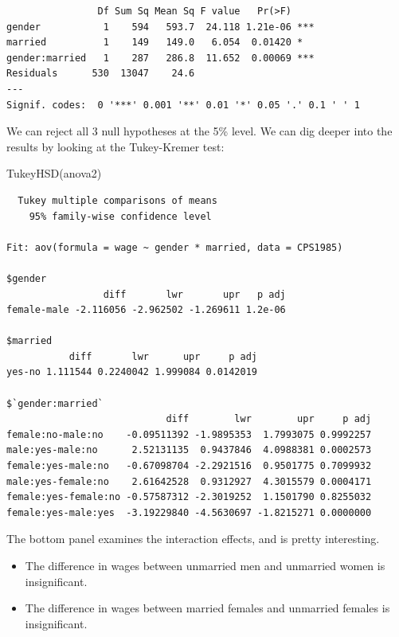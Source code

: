 \documentclass[
  letterpaper,
]{book}
\newenvironment{Shaded}{\begin{snugshade}}{\end{snugshade}}
\newcommand{\FunctionTok}[1]{\textcolor[rgb]{0.28,0.35,0.67}{#1}}
\newcommand{\NormalTok}[1]{\textcolor[rgb]{0.00,0.23,0.31}{#1}}
\providecommand{\tightlist}{%
  \setlength{\itemsep}{0pt}\setlength{\parskip}{0pt}}\usepackage{longtable,booktabs,array}
\begin{document}
\begin{verbatim}
                Df Sum Sq Mean Sq F value   Pr(>F)    
gender           1    594   593.7  24.118 1.21e-06 ***
married          1    149   149.0   6.054  0.01420 *  
gender:married   1    287   286.8  11.652  0.00069 ***
Residuals      530  13047    24.6                     
---
Signif. codes:  0 '***' 0.001 '**' 0.01 '*' 0.05 '.' 0.1 ' ' 1
\end{verbatim}

We can reject all 3 null hypotheses at the 5\% level. We can dig deeper
into the results by looking at the Tukey-Kremer test:

\begin{Shaded}
\begin{Highlighting}[]
\FunctionTok{TukeyHSD}\NormalTok{(anova2)}
\end{Highlighting}
\end{Shaded}

\begin{verbatim}
  Tukey multiple comparisons of means
    95% family-wise confidence level

Fit: aov(formula = wage ~ gender * married, data = CPS1985)

$gender
                 diff       lwr       upr   p adj
female-male -2.116056 -2.962502 -1.269611 1.2e-06

$married
           diff       lwr      upr     p adj
yes-no 1.111544 0.2240042 1.999084 0.0142019

$`gender:married`
                            diff        lwr        upr     p adj
female:no-male:no    -0.09511392 -1.9895353  1.7993075 0.9992257
male:yes-male:no      2.52131135  0.9437846  4.0988381 0.0002573
female:yes-male:no   -0.67098704 -2.2921516  0.9501775 0.7099932
male:yes-female:no    2.61642528  0.9312927  4.3015579 0.0004171
female:yes-female:no -0.57587312 -2.3019252  1.1501790 0.8255032
female:yes-male:yes  -3.19229840 -4.5630697 -1.8215271 0.0000000
\end{verbatim}

The bottom panel examines the interaction effects, and is pretty
interesting.

\begin{itemize}
\tightlist
\item
  The difference in wages between unmarried men and unmarried women is
  insignificant.
\item
  The difference in wages between married females and unmarried females
  is insignificant.
\end{itemize}
\end{document}

